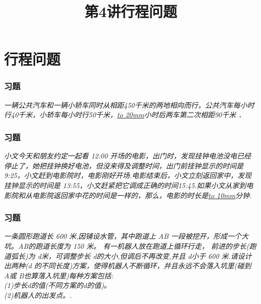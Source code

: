\section{行程问题}

\title[第4讲\quad 行程问题]{第4讲\quad 行程问题} 
\author{}
\date{}

\begin{frame}
    \titlepage
\end{frame}

\setcounter{framecounter}{0}

\begin{frame}
    \frametitle{习题\theframecounter}
    \vspace*{-3cm}
    \textit{一辆公共汽车和一辆小轿车同时从相距450千米的两地相向而行，公共汽车每小时行40千米，小轿车每小时行50千米，\underline{\hbox to 20mm{}}小时后两车第二次相距90千米 ．} 
\end{frame}

\begin{frame}
    \frametitle{习题\theframecounter}
    \vspace*{-3cm}
    \textit{小文今天和朋友约定一起看 12:00 开场的电影，出门时，发现挂钟电池没电已经停止了，她把挂钟换好电池，但没来得及调整时间，出门前挂钟显示的时间是 9:25，小文赶到电影院时，电影刚好开场.电影结束后，小文立刻返回家中，发现挂钟显示的时间是 13:55，小文赶紧把它调成正确的时间15:45.如果小文从家到电影院和从电影院返回家中花的时间是一样的，那么，电影的时长是\underline{\hbox to 10mm{}}分钟.}
\end{frame}


\begin{frame}
    \frametitle{习题\theframecounter}
    \vspace*{-1cm}
    \textit{一条圆形跑道长 600 米,因铺设水管，其中跑道上 AB 一段被挖开，形成一个大坑。AB的跑道长度为 150 米。 有一机器人放在跑道上循环行走， 前进的步长(跑道弧长)为 d米，可调整步长 d的大小,但调后不再改变,并且 d小于 600 米.请设计出两种(d 的不同长度)方案，使得机器人不断循环，并且永远不会落入坑里(碰到 A或 B也算落入坑里)每种方案包括:\\
    (1)步长d的值(不同方案的d的值)。\\
    (2)机器人的出发点。.}
\end{frame}

